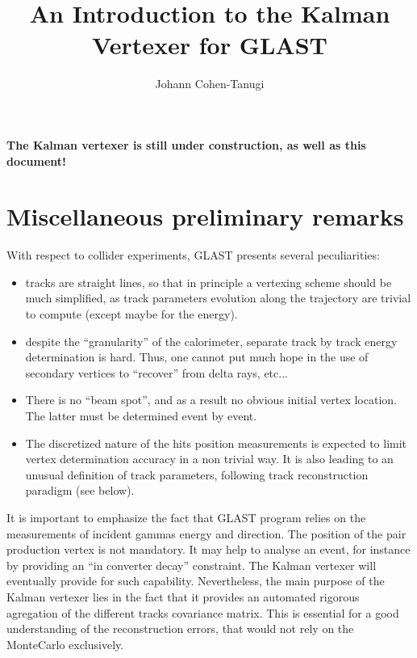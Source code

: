 \documentclass[12pt,final]{article}
\begin{document}
\title{An Introduction to the Kalman Vertexer for GLAST}
\author{Johann Cohen-Tanugi}
\maketitle
{\bf\huge The Kalman vertexer is still under construction, as well as this document! } 


\section{Miscellaneous preliminary remarks}

With respect to collider experiments, GLAST presents several peculiarities:
\begin{itemize}
\item tracks are straight lines, so that in principle a vertexing scheme should be much simplified, 
as track parameters evolution along the trajectory are trivial to compute (except maybe for the energy).
\item despite the ``granularity'' of the calorimeter, separate track by track 
energy determination is hard. Thus, one cannot put much hope in the use of secondary vertices 
to ``recover'' from delta rays, etc...
\item There is no ``beam spot'', and as a result no obvious initial vertex location.
The latter must be determined event by event. 
\item The discretized nature of the hits position measurements is expected to limit 
vertex determination accuracy in a non trivial way. It is also leading to an unusual
definition of track parameters, following track reconstruction paradigm (see below).
\end{itemize}

It is important to emphasize the fact that GLAST program relies on the measurements of 
incident gammas energy and direction. The position of the pair production vertex is not mandatory.
It may help to analyse an event, for instance by providing an ``in converter decay'' constraint. 
The Kalman vertexer will eventually provide for such capability.
Nevertheless, the main purpose of the Kalman vertexer lies in the fact that 
it provides an automated rigorous agregation of the different tracks covariance matrix. 
This is essential for a good understanding of the reconstruction errors, that would not rely on 
the MonteCarlo exclusively.
\end{document}
